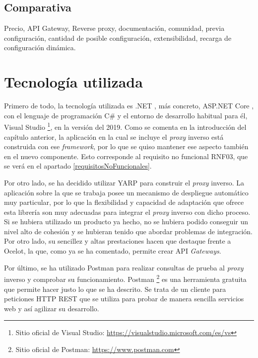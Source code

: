 \documentclass[11pt,spanish,listoffigures]{tfgetsinf}
\begin{document}

	\section{Comparativa}

Precio, API Gateway, Reverse proxy, documentación, comunidad, previa configuración, cantidad de posible configuración, extensibilidad, recarga de configuración dinámica.


\chapter{Tecnología utilizada} \label{tecnologiaUtilizada}

Primero de todo, la tecnología utilizada es .NET \cite{DotNet}, más concreto, ASP.NET Core \cite{DotNetCore}, con el lenguaje de programación C\# \cite{Csharp} y el entorno de desarrollo habitual para él, Visual Studio \footnote{Sitio oficial de Visual Studio: \url{https://visualstudio.microsoft.com/es/vs}}, en la versión del 2019. Como se comenta en la introducción del capítulo anterior, la aplicación en la cual se incluye el \emph{proxy} inverso está construida con ese \emph{framework}, por lo que se quiso mantener ese aspecto también en el nuevo componente. Esto corresponde al requisito no funcional RNF03, que se verá en el apartado \ref{requisitosNoFuncionales}.

Por otro lado, se ha decidido utilizar YARP para construir el \emph{proxy} inverso. La aplicación sobre la que se trabaja posee un mecanismo de despliegue automático muy 
particular, por lo que la flexibilidad y capacidad de adaptación que ofrece esta librería son muy adecuadas para integrar el \emph{proxy} inverso con dicho proceso. Si se hubiera utilizado un producto ya hecho, no se hubiera podido conseguir un nivel alto de cohesión y se hubieran tenido que abordar problemas de integración. Por otro lado, su sencillez y altas prestaciones hacen que destaque frente a Ocelot, la que, como ya se ha comentado, permite crear API \emph{Gateways}.

Por último, se ha utilizado Postman para realizar consultas de prueba al \emph{proxy} inverso y comprobar su funcionamiento. Postman \footnote{Sitio oficial de Postman: \url{https://www.postman.com}} es una herramienta gratuita que permite hacer justo lo que se ha descrito. Se trata de un cliente para peticiones HTTP REST que se utiliza para probar de manera sencilla servicios web y así agilizar su desarrollo.
\end{document}

